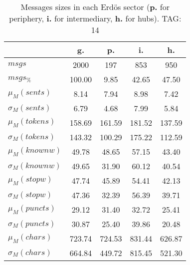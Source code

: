 \begin{table}[h!]
\begin{center}
\begin{tabular}{| l | c | c | c | c |}\hline
 & g. & p. & i. & h. \\\hline
$msgs$ & 2000  & 197  & 853  & 950 \\\hline
$msgs_{\%}$ & 100.00  & 9.85  & 42.65  & 47.50 \\\hline
$\mu_M(sents)$ & 8.14  & 7.94  & 8.98  & 7.42 \\\hline
$\sigma_M(sents)$ & 6.79  & 4.68  & 7.99  & 5.84 \\\hline
$\mu_M(tokens)$ & 158.69  & 161.59  & 181.52  & 137.59 \\\hline
$\sigma_M(tokens)$ & 143.32  & 100.29  & 175.22  & 112.59 \\\hline
$\mu_M(knownw)$ & 49.78  & 48.65  & 57.15  & 43.40 \\\hline
$\sigma_M(knownw)$ & 49.65  & 31.90  & 60.12  & 40.54 \\\hline
$\mu_M(stopw)$ & 47.74  & 45.89  & 54.41  & 42.13 \\\hline
$\sigma_M(stopw)$ & 47.36  & 32.39  & 56.39  & 39.71 \\\hline
$\mu_M(puncts)$ & 29.12  & 31.40  & 32.72  & 25.41 \\\hline
$\sigma_M(puncts)$ & 30.87  & 25.40  & 39.86  & 20.48 \\\hline
$\mu_M(chars)$ & 723.74  & 724.53  & 831.44  & 626.87 \\\hline
$\sigma_M(chars)$ & 664.84  & 449.72  & 815.45  & 521.30 \\\hline
\end{tabular}
\caption{Messages sizes in each Erd\"os sector ({{\bf p.}} for periphery, {{\bf i.}} for intermediary, {{\bf h.}} for hubs). TAG: 14}
\end{center}
\end{table}
